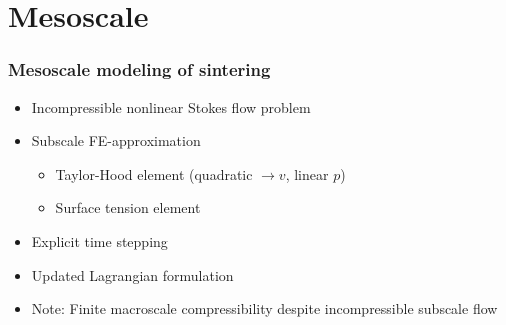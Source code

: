 \documentclass[11pt,mathserif]{beamer}
\begin{document}
\section{Mesoscale}
\begin{frame}
 \frametitle{Mesoscale modeling of sintering}

 \begin{itemize}
  \item Incompressible nonlinear Stokes flow problem
  \item Subscale FE-approximation
  \begin{itemize}
    \item Taylor-Hood element (quadratic $\to v$, linear $p$)
    \item Surface tension element
  \end{itemize}
  \item Explicit time stepping
  \item Updated Lagrangian formulation
  \item \alert{Note: Finite macroscale compressibility despite incompressible subscale flow}
 \end{itemize}


\end{frame}
\end{document}
